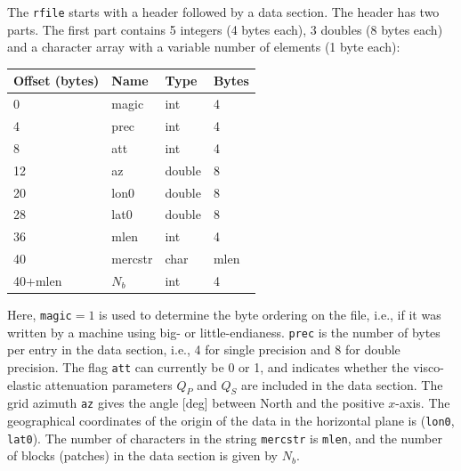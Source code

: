 \documentclass[11pt]{report}
\begin{document}
The {\tt rfile} starts with a header followed by a data section. The header has two parts. The first
part contains 5 integers (4 bytes each), 3 doubles (8 bytes each) and a character array with a
variable number of elements (1 byte each):
\begin{center}
\begin{tabular}{llll}\hline
Offset (bytes) & Name & Type & Bytes \\ \hline
0 & magic  & int & 4 \\ \hline
4 & prec   & int & 4 \\ \hline
8 & att    & int & 4 \\ \hline
12 & az     & double & 8 \\ \hline
20 & lon0   & double & 8 \\ \hline
28 & lat0   & double & 8 \\ \hline
36 & mlen   & int & 4 \\ \hline
40 & mercstr & char & mlen \\ \hline
40+mlen & $N_b$  & int & 4 \\ \hline
\end{tabular}
\end{center}
Here, {\tt magic}$=1$ is used to determine the byte ordering on the file, i.e., if it was written by
a machine using big- or little-endianess. {\tt prec} is the number of bytes per entry in the data
section, i.e., 4 for single precision and 8 for double precision. The flag {\tt att} can currently
be 0 or 1, and indicates whether the visco-elastic attenuation parameters $Q_P$ and $Q_S$ are
included in the data section. The grid azimuth {\tt az} gives the angle [deg] between North and the
positive $x$-axis. The geographical coordinates of the origin of the data in the horizontal plane is
({\tt lon0}, {\tt lat0}). The number of characters in the string {\tt mercstr} is {\tt mlen}, and
the number of blocks (patches) in the data section is given by $N_b$.
\end{document}

